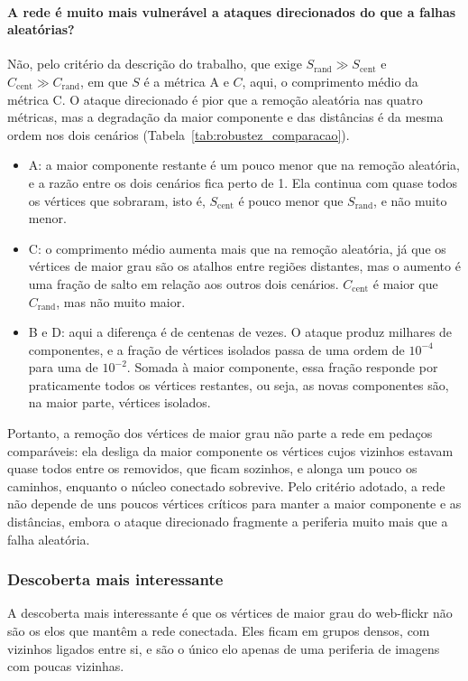 \paragraph{A rede é muito mais vulnerável a ataques direcionados do que a falhas aleatórias?} Não, pelo critério da descrição do trabalho, que exige $S_{\mathrm{rand}} \gg S_{\mathrm{cent}}$ e $C_{\mathrm{cent}} \gg C_{\mathrm{rand}}$, em que $S$ é a métrica A e $C$, aqui, o comprimento médio da métrica C. O ataque direcionado é pior que a remoção aleatória nas quatro métricas, mas a degradação da maior componente e das distâncias é da mesma ordem nos dois cenários (Tabela~\ref{tab:robustez_comparacao}).
\begin{itemize}
  \item A: a maior componente restante é um pouco menor que na remoção aleatória, e a razão entre os dois cenários fica perto de 1. Ela continua com quase todos os vértices que sobraram, isto é, $S_{\mathrm{cent}}$ é pouco menor que $S_{\mathrm{rand}}$, e não muito menor.
  \item C: o comprimento médio aumenta mais que na remoção aleatória, já que os vértices de maior grau são os atalhos entre regiões distantes, mas o aumento é uma fração de salto em relação aos outros dois cenários. $C_{\mathrm{cent}}$ é maior que $C_{\mathrm{rand}}$, mas não muito maior.
  \item B e D: aqui a diferença é de centenas de vezes. O ataque produz milhares de componentes, e a fração de vértices isolados passa de uma ordem de $10^{-4}$ para uma de $10^{-2}$. Somada à maior componente, essa fração responde por praticamente todos os vértices restantes, ou seja, as novas componentes são, na maior parte, vértices isolados.
\end{itemize}
Portanto, a remoção dos vértices de maior grau não parte a rede em pedaços comparáveis: ela desliga da maior componente os vértices cujos vizinhos estavam quase todos entre os removidos, que ficam sozinhos, e alonga um pouco os caminhos, enquanto o núcleo conectado sobrevive. Pelo critério adotado, a rede não depende de uns poucos vértices críticos para manter a maior componente e as distâncias, embora o ataque direcionado fragmente a periferia muito mais que a falha aleatória.

\subsubsection{Descoberta mais interessante}

A descoberta mais interessante é que os vértices de maior grau do web-flickr não são os elos que mantêm a rede conectada. Eles ficam em grupos densos, com vizinhos ligados entre si, e são o único elo apenas de uma periferia de imagens com poucas vizinhas.

